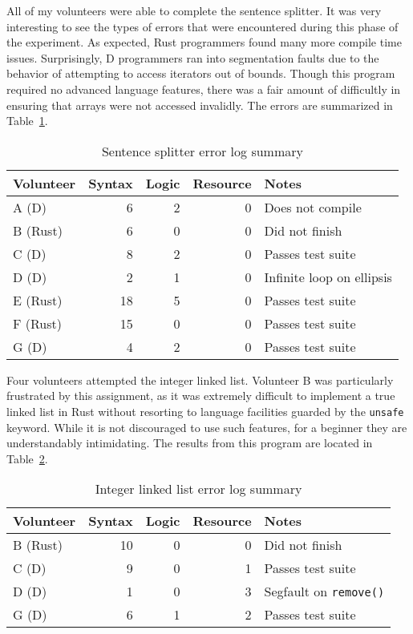 \documentclass[finalcopy]{srpaper}
\begin{document}
All of my volunteers were able to complete the sentence splitter. It was very
interesting to see the types of errors that were encountered during this phase
of the experiment. As expected, Rust programmers found many more compile time
issues. Surprisingly, D programmers ran into segmentation faults due to the
behavior of attempting to access iterators out of bounds. Though this program
required no advanced language features, there was a fair amount of difficultly
in ensuring that arrays were not accessed invalidly. The errors are summarized
in Table~\ref{tab:sentencesplitter}.

\begin{table}[h]
\centering
\begin{tabular}{lrrrp{5cm}}
\toprule
Volunteer & Syntax & Logic & Resource & Notes \\
\midrule
A (D) & 6 & 2 & 0 & Does not compile \\
B (Rust) & 6 & 0 & 0 & Did not finish \\
C (D) & 8 & 2 & 0 & Passes test suite \\
D (D) & 2 & 1 & 0 & Infinite loop on ellipsis \\
E (Rust) & 18 & 5 & 0 & Passes test suite \\
F (Rust) & 15 & 0 & 0 & Passes test suite \\
G (D) & 4 & 2 & 0 & Passes test suite \\
\bottomrule
\end{tabular}
\caption{Sentence splitter error log summary}
\label{tab:sentencesplitter}
\end{table}

Four volunteers attempted the integer linked list. Volunteer B was
particularly frustrated by this assignment, as it was extremely difficult to
implement a true linked list in Rust without resorting to language facilities
guarded by the \texttt{unsafe} keyword. While it is not discouraged to use
such features, for a beginner they are understandably intimidating. The
results from this program are located in Table~\ref{tab:intlinkedlist}.

\begin{table}[h]
\centering
\begin{tabular}{lrrrp{5cm}}
\toprule
Volunteer & Syntax & Logic & Resource & Notes \\
\midrule
B (Rust) & 10 & 0 & 0 & Did not finish \\
C (D) & 9 & 0 & 1 & Passes test suite \\
D (D) & 1 & 0 & 3 & Segfault on \texttt{remove()} \\
G (D) & 6 & 1 & 2 & Passes test suite \\
\bottomrule
\end{tabular}
\caption{Integer linked list error log summary}
\label{tab:intlinkedlist}
\end{table}
\end{document}
